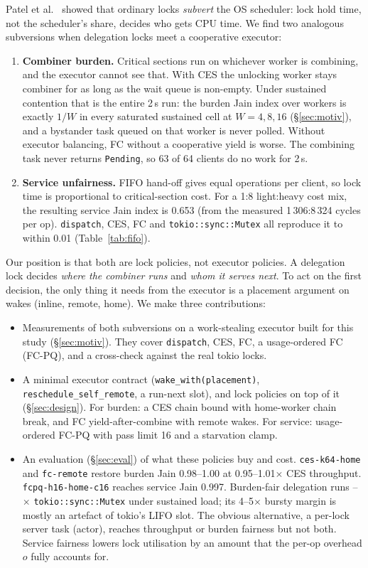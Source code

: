 \documentclass[10pt,twocolumn]{article}
\newcommand{\lk}[1]{\texttt{#1}}
\begin{document}
Patel et al.~\cite{scl} showed that ordinary locks \emph{subvert} the OS
scheduler: lock hold time, not the scheduler's share, decides who gets CPU
time. We find two analogous subversions when delegation locks meet a
cooperative executor:

\begin{enumerate}
\item \textbf{Combiner burden.} Critical sections run on whichever worker is
  combining, and the executor cannot see that. With CES the unlocking worker
  stays combiner for as long as the wait queue is non-empty. Under sustained
  contention that is the entire 2\,s run: the burden Jain index over workers
  is exactly $1/W$ in every saturated sustained cell at $W{=}4,8,16$ (\S\ref{sec:motiv}), and a bystander task
  queued on that worker is never polled. Without executor balancing, FC without a cooperative
  yield is worse. The combining task never returns \lk{Pending}, so 63 of 64 clients do
  no work for 2\,s.
\item \textbf{Service unfairness.} FIFO hand-off gives equal operations per
  client, so lock time is proportional to critical-section cost. For a 1:8
  light:heavy cost mix, the resulting service Jain index is 0.653 (from the
  measured 1\,306:8\,324 cycles per op). \lk{dispatch}, CES, FC and
  \lk{tokio::sync::Mutex} all reproduce it to within 0.01 (Table~\ref{tab:fifo}).
\end{enumerate}

Our position is that both are lock policies, not executor policies. A
delegation lock decides \emph{where the combiner runs} and \emph{whom it serves
next}. To act on the first decision, the only thing it needs from the executor
is a placement argument on wakes (inline, remote, home). We make three
contributions:

\begin{itemize}
\item Measurements of both subversions on a work-stealing executor built for
  this study (\S\ref{sec:motiv}). They cover \lk{dispatch}, CES, FC, a
  usage-ordered FC (FC-PQ), and a cross-check against the real tokio locks.
\item A minimal executor contract (\lk{wake\_with(placement)},
  \lk{reschedule\_self\_remote}, a run-next slot), and lock policies on top of
  it (\S\ref{sec:design}). For burden: a CES chain bound with home-worker chain
  break, and FC yield-after-combine with remote wakes. For service: usage-ordered
  FC-PQ with pass limit 16 and a starvation clamp.
\item An evaluation (\S\ref{sec:eval}) of what these policies buy and cost.
  \lk{ces-k64-home} and \lk{fc-remote} restore burden Jain 0.98--1.00 at
  0.95--1.01$\times$ CES throughput. \lk{fcpq-h16-home-c16} reaches service Jain
  0.997. Burden-fair delegation runs \SusOnLo--\SusOnHi$\times$
  \lk{tokio::sync::Mutex} under sustained load; its 4--5$\times$ bursty margin
  is mostly an artefact of tokio's LIFO slot. The obvious alternative, a
  per-lock server task (actor), reaches throughput or burden fairness but not
  both. Service fairness lowers lock utilisation by an amount that the
  per-op overhead $o$ fully accounts for.
\end{itemize}
\end{document}
